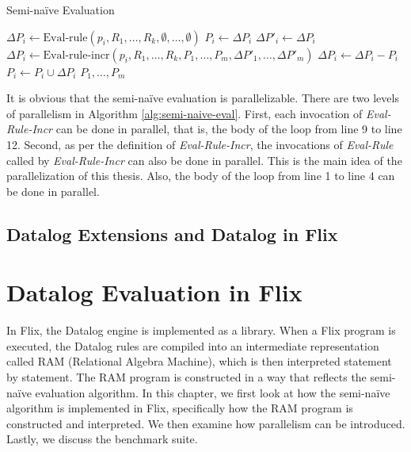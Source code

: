 \documentclass[twoside,11pt,openright]{report}
\theoremstyle{definition}
\begin{document}
\begin{algorithm}
  \caption{Semi-naïve Evaluation}
  \begin{algorithmic}[1]
    \State $\Delta P_i \leftarrow \text{Eval-rule}(p_i, R_1, \ldots, R_k, \emptyset, \ldots, \emptyset)$
    \State $P_i \leftarrow \Delta P_i$
    \EndFor
    \Repeat
    \State $\Delta P'_i \leftarrow \Delta P_i$
    \EndFor
    \State $\Delta P_i \leftarrow \text{Eval-rule-incr}(p_i, R_1, \ldots, R_k, P_1, \ldots, P_m, \Delta P'_1, \ldots, \Delta P'_m)$
    \State $\Delta P_i \leftarrow \Delta P_i - P_i$
    \EndFor
    \State $P_i \leftarrow P_i \cup \Delta P_i$
    \EndFor
    \State \Return $P_1, \ldots, P_m$
  \end{algorithmic}
\end{algorithm}
\label{alg:semi-naive-eval}

It is obvious that the semi-naïve evaluation is parallelizable. There are two levels of parallelism in Algorithm \ref{alg:semi-naive-eval}. First, each invocation of \textit{Eval-Rule-Incr} can be done in parallel, that is, the body of the loop from line 9 to line 12. Second, as per the definition of \textit{Eval-Rule-Incr}, the invocations of \textit{Eval-Rule} called by \textit{Eval-Rule-Incr} can also be done in parallel. This is the main idea of the parallelization of this thesis. Also, the body of the loop from line 1 to line 4 can be done in parallel.

\section{Datalog Extensions and Datalog in Flix}


\chapter{Datalog Evaluation in Flix}
\label{ch:datalog_evaluation}

In Flix, the Datalog engine is implemented as a library. When a Flix program is executed, the Datalog rules are compiled into an intermediate representation called RAM (Relational Algebra Machine), which is then interpreted statement by statement. The RAM program is constructed in a way that reflects the semi-naïve evaluation algorithm. In this chapter, we first look at how the semi-naïve algorithm is implemented in Flix, specifically how the RAM program is constructed and interpreted. We then examine how parallelism can be introduced. Lastly, we discuss the benchmark suite.
\end{document}
